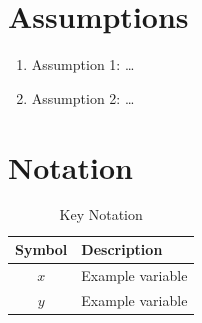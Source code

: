 \section{Assumptions}

\begin{enumerate}
  \item Assumption 1: \ldots
  \item Assumption 2: \ldots
\end{enumerate}

\section{Notation}

\begin{table}[H]
\centering
\caption{Key Notation}
\begin{tabular}{cl}
\toprule
\textbf{Symbol} & \textbf{Description} \\
\midrule
$x$ & Example variable \\
$y$ & Example variable \\
\bottomrule
\end{tabular}
\end{table}
